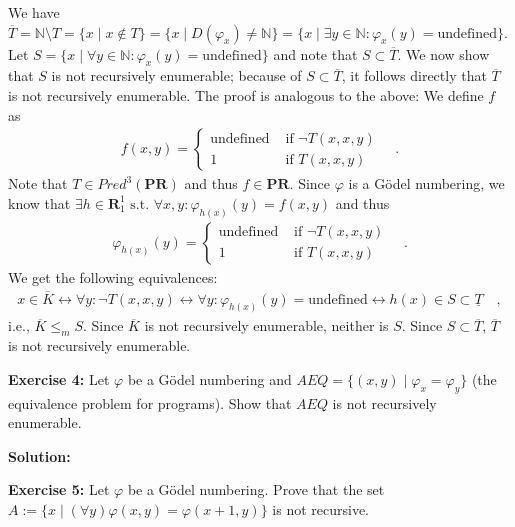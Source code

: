 \documentclass [11pt]{article}
\newcommand{\N}{\ensuremath{\mathbb{N}}}
\newcommand{\PR}{\textbf{PR}}
\newcommand{\R}{\textbf{R}}
\newcommand{\lra}{\ensuremath{\leftrightarrow}}
\begin{document}
We have $\overline{T} = \N\setminus T = \{x\mid x \not \in T \} = \{x\mid D(\varphi_x) \neq \N\} = \{x \mid \exists y \in \N: \varphi_x(y) = \text{undefined}\}$. 
Let $S = \{x\mid \forall y\in \N: \varphi_x(y) = \text{undefined}\}$ and note that $S \subset \overline{T}$.
We now show that $S$ is not recursively enumerable; because of $S \subset \overline{T}$, it follows directly that $\overline{T}$ is not recursively enumerable.
The proof is analogous to the above:
We define $f$ as 
\begin{align*}
 f(x,y) = \begin{cases}
           \text{undefined} & \text{ if } \neg T(x,x,y) \\
           1 &\text{ if } T(x,x,y)
          \end{cases} \quad .
\end{align*} 
Note that $T \in Pred^3(\PR)$ and thus $f \in \PR$.
Since $\varphi$ is a G\"odel numbering, we know that $\exists h \in \R_1^1 \text{ s.t.\ } \forall x,y :\varphi_{h(x)}(y) = f(x,y)$ and thus
\begin{align*}
\varphi_{h(x)}(y) = \begin{cases}
           \text{undefined} & \text{ if } \neg T(x,x,y) \\
           1 &\text{ if } T(x,x,y)
          \end{cases} \quad .
\end{align*} 
We get the following equivalences:
\begin{align*}
x\in \overline{K} \lra \forall y: \neg T(x,x,y) \lra \forall y: \varphi_{h(x)}(y) = \text{undefined} \lra h(x) \in S \subset \underline{T} \quad , 
\end{align*}
i.e., $\overline{K} \leq_m S$. 
Since $\overline{K}$ is not recursively enumerable, neither is $S$.
Since $S \subset \overline{T}$, $\overline{T}$ is not recursively enumerable.

\bigskip
\noindent
\textbf{Exercise 4:} Let $\varphi$ be a G\"odel numbering and $AEQ = \{(x,y) \mid \varphi_x = \varphi_y \}$ (the equivalence problem for programs). Show that $AEQ$ is not recursively enumerable.

\noindent
\textbf{Solution:}

\bigskip
\noindent
\textbf{Exercise 5:} Let $\varphi$ be a G\"odel numbering. Prove that the set $A:= \{x \mid (\forall y)\varphi(x,y) = \varphi(x+1,y)\}$ is not recursive.
\end{document}
